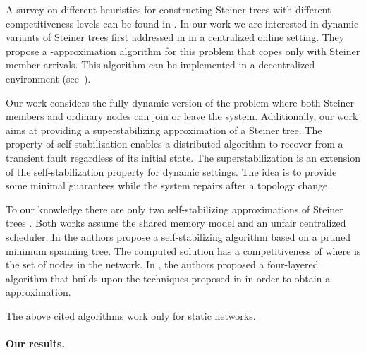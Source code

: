 \documentclass[11pt]{article}
\begin{document}
A survey on different heuristics for constructing Steiner trees with different competitiveness levels can be found
in \cite{thesis96,Steiner_survey}.
In our work we are interested in dynamic variants of Steiner trees
first addressed in \cite{ImaseWaxman91} in a centralized online setting.
They propose a -approximation algorithm for this problem that copes
only with Steiner member arrivals. This algorithm can be 
implemented in a decentralized environment (see~\cite{GataniRG05}).

Our work considers the fully dynamic version
of the problem where both Steiner members and ordinary nodes can join
or leave the system.
Additionally, our work aims at providing a 
superstabilizing approximation of a Steiner tree. 
The property of self-stabilization  \cite{Dij74,Dol00} enables a distributed
algorithm to recover from a transient fault regardless of its initial
state. The superstabilization \cite{Dolev_SuperStab} is an extension of the
self-stabilization property for dynamic settings. The idea is to
provide some minimal guarantees while the system repairs after a 
topology change.

To our knowledge there are only two self-stabilizing approximations of
Steiner trees
\cite{SS_Steiner02,Kakugawa_Steiner_journal}. Both works assume the 
shared memory model and an unfair centralized scheduler.
In \cite{SS_Steiner02} the authors propose a self-stabilizing
algorithm based on a pruned minimum spanning 
tree. 
The computed solution has a competitiveness of
 where  is the set of nodes in the network. 
In \cite{Kakugawa_Steiner_journal}, the authors proposed a
four-layered algorithm that builds upon the techniques 
proposed in \cite{WuWW86} in order to obtain a  approximation. 



The above cited algorithms work only for static networks. 


\paragraph{Our results.}
\end{document}
